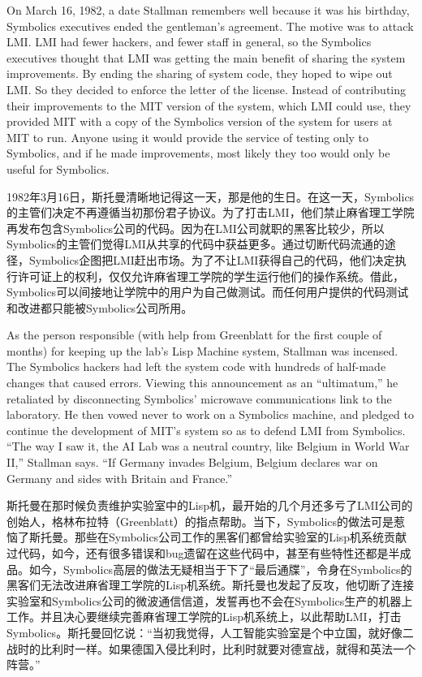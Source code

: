\ifdefined\eng
On March 16, 1982, a date Stallman remembers well because it was his birthday, Symbolics executives ended the gentleman's agreement. The motive was to attack LMI. LMI had fewer hackers, and fewer staff in general, so the Symbolics executives thought that LMI was getting the main benefit of sharing the system improvements.  By ending the sharing of system code, they hoped to wipe out LMI.  So they decided to enforce the letter of the license.  Instead of contributing their improvements to the MIT version of the system, which LMI could use, they provided MIT with a copy of the Symbolics version of the system for users at MIT to run.  Anyone using it would provide the service of testing only to Symbolics, and if he made improvements, most likely they too would only be useful for Symbolics.
\fi

\ifdefined\chs
1982年3月16日，斯托曼清晰地记得这一天，那是他的生日。在这一天，Symbolics的主管们决定不再遵循当初那份君子协议。为了打击LMI，他们禁止麻省理工学院再发布包含Symbolics公司的代码。因为在LMI公司就职的黑客比较少，所以Symbolics的主管们觉得LMI从共享的代码中获益更多。通过切断代码流通的途径，Symbolics企图把LMI赶出市场。为了不让LMI获得自己的代码，他们决定执行许可证上的权利，仅仅允许麻省理工学院的学生运行他们的操作系统。借此，Symbolics可以间接地让学院中的用户为自己做测试。而任何用户提供的代码测试和改进都只能被Symbolics公司所用。
\fi

\ifdefined\eng
As the person responsible (with help from Greenblatt for the first couple of months) for keeping up the lab's Lisp Machine system, Stallman was incensed. The Symbolics hackers had left the system code with hundreds of half-made changes that caused errors. Viewing this announcement as an ``ultimatum,'' he retaliated by disconnecting Symbolics' microwave communications link to the laboratory. He then vowed never to work on a Symbolics machine, and pledged to continue the development of MIT's system so as to defend LMI from Symbolics. ``The way I saw it, the AI Lab was a neutral country, like Belgium in World War II,'' Stallman says. ``If Germany invades Belgium, Belgium declares war on Germany and sides with Britain and France.''
\fi

\ifdefined\chs
斯托曼在那时候负责维护实验室中的Lisp机，最开始的几个月还多亏了LMI公司的创始人，格林布拉特（Greenblatt）的指点帮助。当下，Symbolics的做法可是惹恼了斯托曼。那些在Symbolics公司工作的黑客们都曾给实验室的Lisp机系统贡献过代码，如今，还有很多错误和bug遗留在这些代码中，甚至有些特性还都是半成品。如今，Symbolics高层的做法无疑相当于下了``最后通牒''，令身在Symbolics的黑客们无法改进麻省理工学院的Lisp机系统。斯托曼也发起了反攻，他切断了连接实验室和Symbolics公司的微波通信信道，发誓再也不会在Symbolics生产的机器上工作。并且决心要继续完善麻省理工学院的Lisp机系统上，以此帮助LMI，打击Symbolics。斯托曼回忆说：``当初我觉得，人工智能实验室是个中立国，就好像二战时的比利时一样。如果德国入侵比利时，比利时就要对德宣战，就得和英法一个阵营。''
\fi

